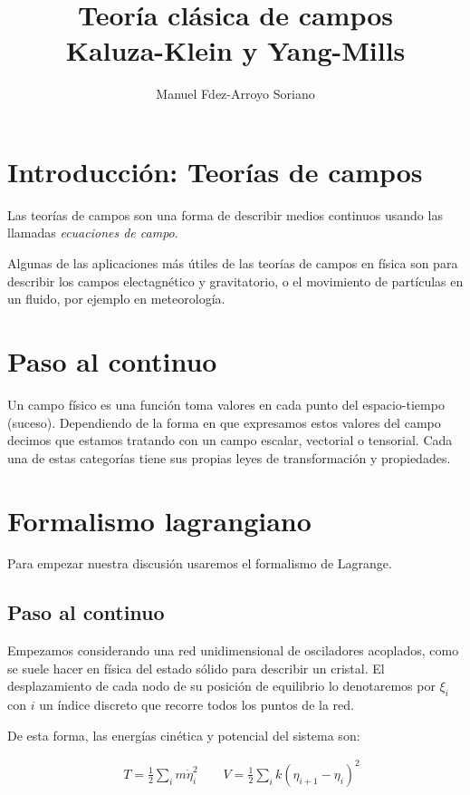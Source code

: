 \documentclass{article}
\title{Teoría clásica de campos \\ Kaluza-Klein y Yang-Mills}
\author{
  Manuel Fdez-Arroyo Soriano
}
\begin{document}
\maketitle

\section{Introducción: Teorías de campos}
\label{sec:in}

Las teorías de campos son una forma de describir medios continuos usando las llamadas \textit{ecuaciones de campo}.

Algunas de las aplicaciones más útiles de las teorías de campos en física son para describir los campos electagnético y gravitatorio, o el movimiento de partículas en un fluido, por ejemplo en meteorología.

\section{Paso al continuo}

Un campo físico es una función toma valores en cada punto del espacio-tiempo (suceso). Dependiendo de la forma en que expresamos estos valores del campo decimos que estamos tratando con un campo escalar, vectorial o tensorial. Cada una de estas categorías tiene sus propias leyes de transformación y propiedades.



\section{Formalismo lagrangiano}

Para empezar nuestra discusión usaremos el formalismo de Lagrange.

\subsection{Paso al continuo}

Empezamos considerando una red unidimensional de osciladores acoplados, como se suele hacer en física del estado sólido para describir un cristal. El desplazamiento de cada nodo de su posición de equilibrio lo denotaremos por $\xi_i$ con $i$ un índice discreto que recorre todos los puntos de la red.

De esta forma, las energías cinética y potencial del sistema son:

$$
\begin{array}{c}{\quad T=\frac{1}{2} \sum_{i} m \dot{\eta}_{i}^{2}} {\qquad V=\frac{1}{2} \sum_{i} k\left(\eta_{i+1}-\eta_{i}\right)^{2}}\end{array}
$$
\end{document}
